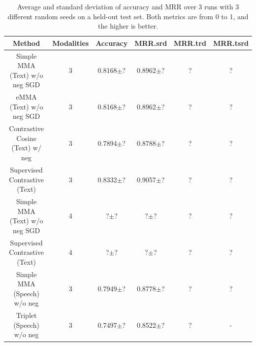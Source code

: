 \documentclass[sigconf,natbib=true,anonymous=true]{acmart}
\newcommand{\todokdinline}[1]{\todo[color=red!20,inline]{{KD: \small #1}}}
\begin{document}
\begin{table}[tbh]
\centering
\begin{tabular}{|c|c|c|c|c|c|}
\toprule
\textbf{Method} & \textbf{Modalities} & \textbf{Accuracy} & \textbf{MRR.srd} & \textbf{MRR.trd} & \textbf{MRR.tsrd} \\ %
\midrule
Simple MMA (Text) w/o neg  SGD & 3 & 0.8168$\pm$? & 0.8962$\pm$? & ? & ? \\
eMMA (Text) w/o neg SGD & 3 & 0.8168$\pm$? & 0.8962$\pm$? & ? & ? \\
Contrastive Cosine (Text) w/ neg & 3 & 0.7894$\pm$? & 0.8788$\pm$?  & ? & ?\\
Supervised Contrastive (Text)& 3 & 0.8332$\pm$? & 0.9057$\pm$? & ? & ?\\
Simple MMA (Text) w/o neg  SGD & 4 & ?$\pm$? & ?$\pm$? & ? & ? \\
Supervised Contrastive (Text)& 4 & ?$\pm$? & ?$\pm$? & ? & ? \\
Simple MMA (Speech) w/o neg & 3 & 0.7949$\pm$? & 0.8778$\pm$? & ? & ?  \\
Triplet (Speech) w/o neg & 3 & 0.7497$\pm$? & 0.8522$\pm$? & ? & -  \\
\bottomrule
\end{tabular}
\caption{\label{table:quantitative}Average and standard deviation of accuracy and MRR over 3 runs with 3 different random seeds on a held-out test set. Both metrics are from 0 to 1, and the higher is better.
}
\end{table}
\end{document}
